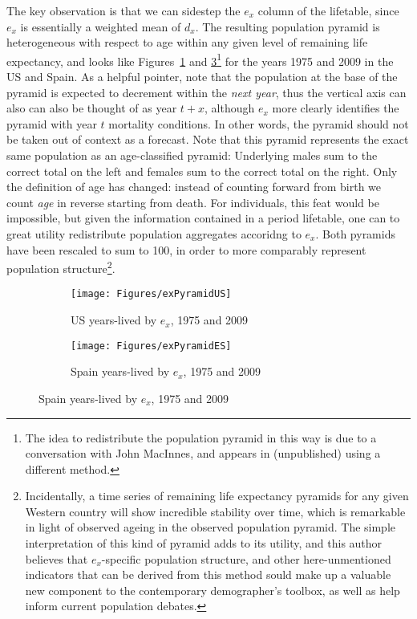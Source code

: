 The key
observation is that we can sidestep the $e_x$ column of the lifetable, since
$e_x$ is essentially a weighted mean of $d_x$. The resulting population pyramid
is heterogeneous with respect to age within any given level of remaining life
expectancy, and looks like
Figures~\ref{fig:exPyrUS} and \ref{fig:exPyrES}\footnote{The idea to
redistribute the population pyramid in this way is due to a conversation with 
John MacInnes, and appears in \citep{MacInnes2013pop} (unpublished) using a
different method.} for the years 1975 and 2009 in the US and Spain. As a helpful
pointer, note that the population at the base of the pyramid is expected to decrement
within the \textit{next year}, thus the vertical axis can also can also be
thought of as year $t+x$, although $e_x$ more clearly identifies the pyramid
with year $t$ mortality conditions. In other words, the pyramid should not be
taken out of context as a forecast. Note that this pyramid represents the
exact same population as an age-classified pyramid: Underlying males sum to the
correct total on the left and females sum to the correct total on the right. Only the definition of age has
changed: instead of counting forward from birth we count \textit{age} in reverse
starting from death. For individuals, this feat would be impossible, but given
 the information contained in a period lifetable,  one can to great utility 
 redistribute population aggregates accoridng to $e_x$.
Both pyramids have been rescaled to sum to 100, in order to more comparably represent population 
structure\footnote{Incidentally, a time series of remaining life expectancy 
pyramids for any given Western country will show incredible stability over time, 
which is remarkable in light of observed ageing in the observed population pyramid. 
The simple interpretation of this kind of pyramid adds to its utility, and this author 
believes that $e_x$-specific population structure, and other here-unmentioned indicators 
that can be derived from this method sould make up a valuable new component to the contemporary
 demographer's toolbox, as well as help inform current population debates.}.

\begin{figure}
        \centering
        \begin{subfigure}
                \centering
                \caption{US years-lived by $e_x$, 1975 and 2009}
                \texttt{[image: Figures/exPyramidUS]}
                \label{fig:exPyrUS}
        \end{subfigure}
        \begin{subfigure}
                \centering
                \caption{Spain years-lived by $e_x$, 1975 and 2009}
                \texttt{[image: Figures/exPyramidES]}
               
                \label{fig:exPyrES}
        \end{subfigure}
\end{figure}

